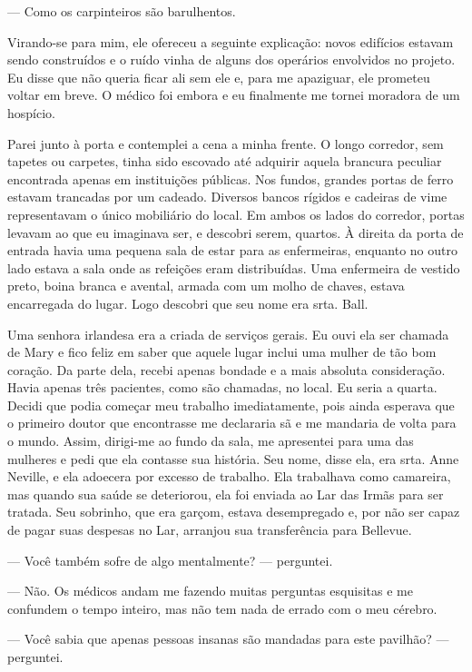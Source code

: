 --- Como os carpinteiros são barulhentos.

Virando-se para mim, ele ofereceu a seguinte explicação: novos edifícios
estavam sendo construídos e o ruído vinha de alguns dos operários
envolvidos no projeto. Eu disse que não queria ficar ali sem ele e, para
me apaziguar, ele prometeu voltar em breve. O médico foi embora e eu
finalmente me tornei moradora de um hospício.

Parei junto à porta e contemplei a cena a minha frente. O longo
corredor, sem tapetes ou carpetes, tinha sido escovado até adquirir
aquela brancura peculiar encontrada apenas em instituições públicas. Nos
fundos, grandes portas de ferro estavam trancadas por um cadeado.
Diversos bancos rígidos e cadeiras de vime representavam o único
mobiliário do local. Em ambos os lados do corredor, portas levavam ao
que eu imaginava ser, e descobri serem, quartos. À direita da porta de
entrada havia uma pequena sala de estar para as enfermeiras, enquanto no
outro lado estava a sala onde as refeições eram distribuídas. Uma
enfermeira de vestido preto, boina branca e avental, armada com um molho
de chaves, estava encarregada do lugar. Logo descobri que seu nome era
srta. Ball.

Uma senhora irlandesa era a criada de serviços gerais. Eu ouvi ela ser
chamada de Mary e fico feliz em saber que aquele lugar inclui uma mulher
de tão bom coração. Da parte dela, recebi apenas bondade e a mais
absoluta consideração. Havia apenas três pacientes, como são chamadas,
no local. Eu seria a quarta. Decidi que podia começar meu trabalho
imediatamente, pois ainda esperava que o primeiro doutor que encontrasse
me declararia sã e me mandaria de volta para o mundo. Assim, dirigi-me
ao fundo da sala, me apresentei para uma das mulheres e pedi que ela
contasse sua história. Seu nome, disse ela, era srta. Anne Neville, e
ela adoecera por excesso de trabalho. Ela trabalhava como camareira, mas
quando sua saúde se deteriorou, ela foi enviada ao Lar das Irmãs para
ser tratada. Seu sobrinho, que era garçom, estava desempregado e, por
não ser capaz de pagar suas despesas no Lar, arranjou sua transferência
para Bellevue.

--- Você também sofre de algo mentalmente? --- perguntei.

--- Não. Os médicos andam me fazendo muitas perguntas esquisitas e me
confundem o tempo inteiro, mas não tem nada de errado com o meu cérebro.

--- Você sabia que apenas pessoas insanas são mandadas para este
pavilhão? --- perguntei.

